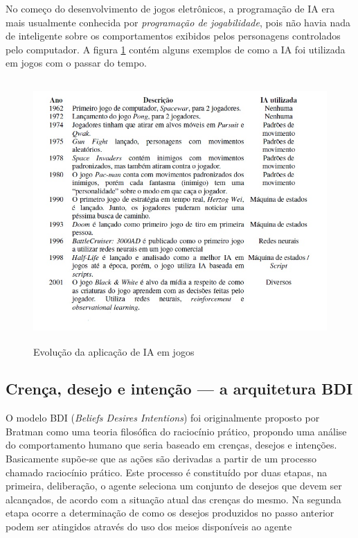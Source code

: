 No começo do desenvolvimento de jogos eletrônicos, a programação de IA era mais usualmente conhecida por \textit{programação de jogabilidade}, pois não havia nada de inteligente sobre os comportamentos exibidos pelos personagens controlados pelo computador. 
A figura \ref{IA em jogos} contém alguns exemplos de como a IA foi utilizada em jogos com o passar do tempo.

\begin{figure}
\centering
\includegraphics [height=10cm]{figuras/evolucao_IA_jogos.jpg}
\caption{Evolução da aplicação de IA em jogos~\cite{brian_schwab}}
\label{IA em jogos}
\end{figure}


\subsection{Crença, desejo e intenção --- a arquitetura BDI}

O modelo BDI (\textit{Beliefs Desires Intentions}) foi originalmente proposto por Bratman como uma teoria filosófica do raciocínio prático, propondo uma análise do comportamento humano que seria baseado em crenças, desejos e intenções.
Basicamente supõe-se que as ações são derivadas a partir de um processo chamado raciocínio prático. Este processo é constituído por duas etapas, na primeira, deliberação, o agente seleciona um conjunto de desejos que devem ser alcançados, de acordo com a situação atual das crenças do mesmo. Na segunda etapa ocorre a determinação de como os desejos produzidos no passo anterior podem ser atingidos através do uso dos meios disponíveis ao agente~\cite{wooldrige_agentes}

